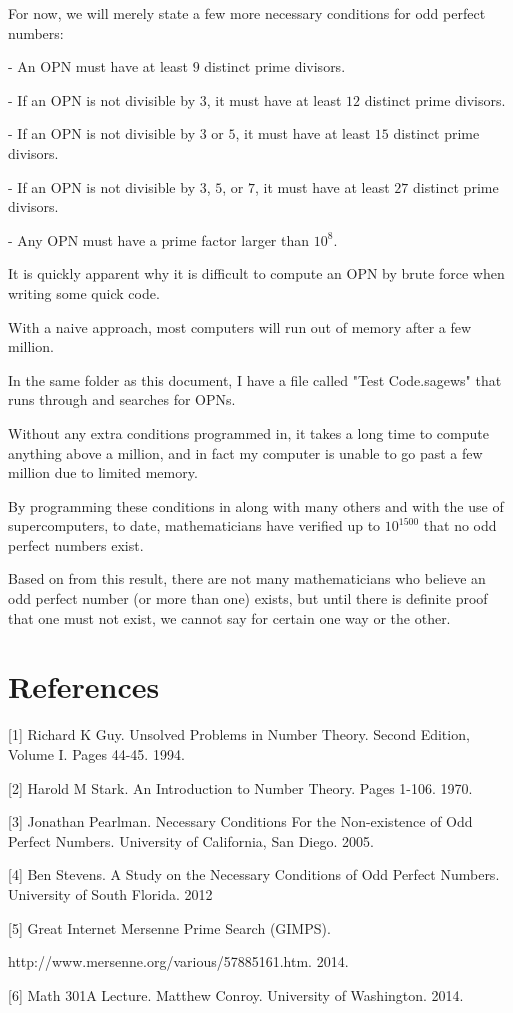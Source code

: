 \documentclass[12pt]{amsart}
\begin{document}
For now, we will merely state a few more necessary conditions for odd perfect numbers:

\bigskip

- An OPN must have at least $9$ distinct prime divisors.

- If an OPN is not divisible by $3$, it must have at least $12$ distinct prime divisors.

- If an OPN is not divisible by $3$ or $5$, it must have at least $15$ distinct prime divisors.

- If an OPN is not divisible by $3$, $5$, or $7$, it must have at least $27$ distinct prime divisors.

- Any OPN must have a prime factor larger than $10^8$.

It is quickly apparent why it is difficult to compute an OPN by brute force when writing some quick code.

With a naive approach, most computers will run out of memory after a few million.

In the same folder as this document, I have a file called "Test Code.sagews" that runs through and searches for OPNs. 

Without any extra conditions programmed in, it takes a long time to compute anything above a million, and in fact my computer is unable to go past a few million due to limited memory.

By programming these conditions in along with many others and with the use of supercomputers, to date, mathematicians have verified up to $10^{1500}$ that no odd perfect numbers exist.

Based on from this result, there are not many mathematicians who believe an odd perfect number (or more than one) exists, but until there is definite proof that one must not exist, we cannot say for certain one way or the other. 

\newpage

\section{References}

[1] Richard K Guy. Unsolved Problems in Number Theory. Second Edition, Volume I. Pages 44-45. 1994.

[2] Harold M Stark. An Introduction to Number Theory. Pages 1-106. 1970.

[3] Jonathan Pearlman. Necessary Conditions For the Non-existence of Odd Perfect Numbers. University of California, San Diego. 2005. 

[4] Ben Stevens. A Study on the Necessary Conditions of Odd Perfect Numbers. University of South Florida. 2012

[5] Great Internet Mersenne Prime Search (GIMPS). 

http://www.mersenne.org/various/57885161.htm. 2014.

[6] Math 301A Lecture. Matthew Conroy. University of Washington. 2014.
\end{document}
